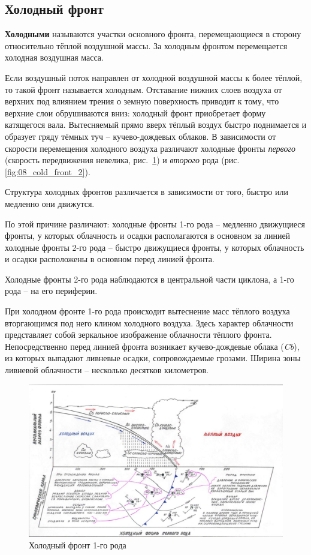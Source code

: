 \documentclass[a4paper, 12pt, twoside, final, book, russian, fittopage, cyremdash, openright]{ncc}
\begin{document}
\subsection{Холодный фронт}
\label{sec:cold_front}

\textbf{Холодными} называются участки основного фронта, перемещающиеся в
сторону относительно тёплой воздушной массы. За холодным фронтом
перемещается холодная воздушная масса.

Если воздушный поток направлен от холодной воздушной массы к более
тёплой, то такой фронт называется холодным. Отставание нижних слоев
воздуха от верхних под влиянием трения о земную поверхность приводит к
тому, что верхние слои обрушиваются вниз: холодный фронт приобретает
форму катящегося вала. Вытесняемый прямо вверх тёплый воздух быстро
поднимается и образует гряду тёмных туч \--- кучево-дождевых
облаков. В зависимости от скорости перемещения холодного воздуха
различают холодные фронты \textit{первого} (скорость передвижения
невелика, рис.~\ref{fig:07_cold_front_1}) и \textit{второго} рода
(рис.\ref{fig:08_cold_front_2}).

Структура холодных фронтов различается в зависимости от того, быстро
или медленно они движутся.

По этой причине различают: холодные фронты 1-го
рода \--- медленно движущиеся фронты,
у которых облачность и осадки располагаются в основном за линией
холодные фронты 2-го рода \--- быстро
движущиеся фронты, у которых облачность и осадки расположены в
основном перед линией фронта.

Холодные фронты 2-го рода наблюдаются в центральной части
циклона, а 1-го рода \--- на его периферии.

При холодном фронте 1-го рода происходит вытеснение масс тёплого
воздуха вторгающимся под него клином холодного воздуха. Здесь характер
облачности представляет собой зеркальное изображение облачности
тёплого фронта. Непосредственно перед линией фронта возникает
кучево-дождевые облака (\textit{Cb}), из которых выпадают ливневые осадки,
сопровождаемые грозами. Ширина зоны ливневой облачности \--- несколько
десятков километров.

\begin{figure}[htb]
   \centering
   \includegraphics[scale=0.7]{07_cold_front_1.pdf}
   \caption{Холодный фронт 1-го рода}
   \label{fig:07_cold_front_1}
\end{figure}
\end{document}
